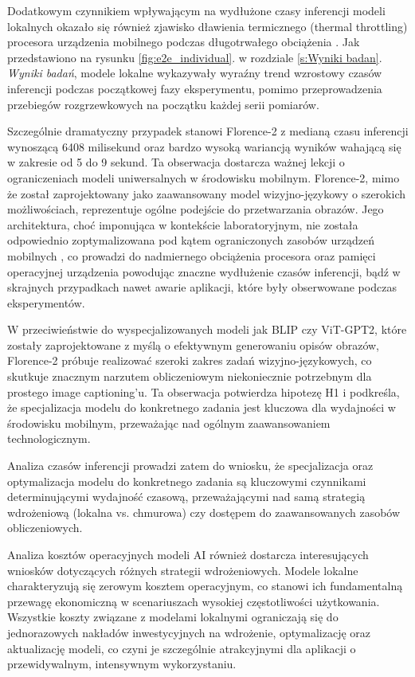 Dodatkowym czynnikiem wpływającym na wydłużone czasy inferencji modeli lokalnych okazało się również zjawisko dławienia termicznego (thermal throttling) procesora urządzenia mobilnego
podczas długotrwałego obciążenia \cite{panchal2024thermal}. Jak przedstawiono na rysunku \ref{fig:e2e_individual}. w rozdziale \ref{s:Wyniki badan}. \textit{Wyniki badań},
modele lokalne wykazywały wyraźny trend wzrostowy czasów inferencji podczas początkowej fazy eksperymentu, pomimo przeprowadzenia przebiegów rozgrzewkowych na początku każdej serii pomiarów.

Szczególnie dramatyczny przypadek stanowi Florence-2 z medianą czasu inferencji wynoszącą 6408 milisekund oraz bardzo wysoką wariancją wyników
wahającą się w zakresie od 5 do 9 sekund. Ta obserwacja dostarcza ważnej lekcji o ograniczeniach modeli uniwersalnych w środowisku mobilnym.
Florence-2, mimo że został zaprojektowany jako zaawansowany model wizyjno-językowy o szerokich możliwościach, reprezentuje ogólne podejście do przetwarzania obrazów.
Jego architektura, choć imponująca w kontekście laboratoryjnym, 
nie została odpowiednio zoptymalizowana pod kątem ograniczonych zasobów urządzeń mobilnych \cite{florence2_xiao2024}, co prowadzi do nadmiernego obciążenia procesora oraz pamięci operacyjnej urządzenia
powodując znaczne wydłużenie czasów inferencji, bądź w skrajnych przypadkach nawet awarie aplikacji, które były obserwowane podczas eksperymentów.

W przeciwieństwie do wyspecjalizowanych modeli jak BLIP czy ViT-GPT2, które zostały zaprojektowane z myślą o efektywnym generowaniu opisów obrazów,
Florence-2 próbuje realizować szeroki zakres zadań wizyjno-językowych, co skutkuje znacznym narzutem obliczeniowym niekoniecznie potrzebnym 
dla prostego image captioning'u. Ta obserwacja potwierdza hipotezę H1 i podkreśla, że specjalizacja modelu do konkretnego zadania 
jest kluczowa dla wydajności w środowisku mobilnym, przeważając nad ogólnym zaawansowaniem technologicznym.

Analiza czasów inferencji prowadzi zatem do wniosku, że specjalizacja oraz optymalizacja modelu do konkretnego zadania są kluczowymi czynnikami determinującymi wydajność czasową,
przeważającymi nad samą strategią wdrożeniową (lokalna vs. chmurowa) czy dostępem do zaawansowanych zasobów obliczeniowych.

Analiza kosztów operacyjnych modeli AI również dostarcza interesujących wniosków dotyczących różnych strategii wdrożeniowych.
Modele lokalne charakteryzują się zerowym kosztem operacyjnym, co stanowi ich fundamentalną przewagę ekonomiczną
w scenariuszach wysokiej częstotliwości użytkowania. Wszystkie koszty związane z modelami lokalnymi ograniczają się do jednorazowych nakładów inwestycyjnych
na wdrożenie, optymalizację oraz aktualizację modeli, co czyni je szczególnie atrakcyjnymi dla aplikacji o przewidywalnym, intensywnym wykorzystaniu.

